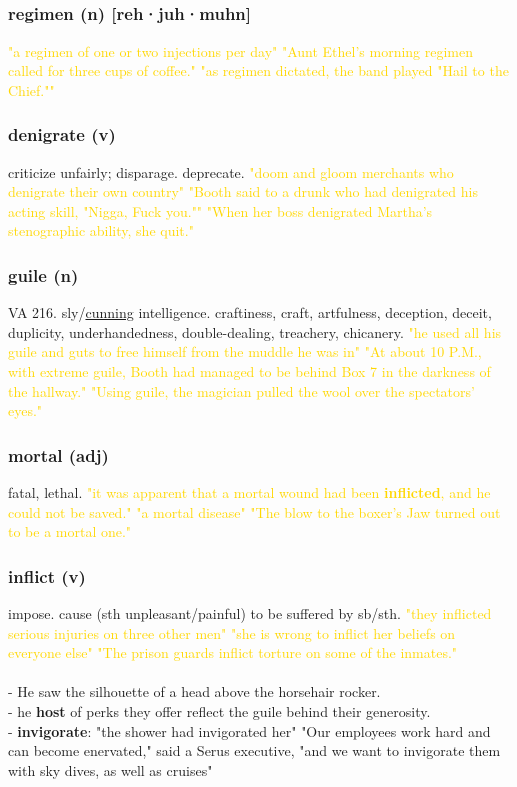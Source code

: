\documentclass{proc}
\begin{document}
	\newpage
	\subsection{}
	\subsubsection{\textcolor{brickred}{regimen} (n) [reh·juh·muhn]}
	\textcolor{gold}{"a regimen of one or two injections per day" "Aunt Ethel's morning regimen called for three cups of coffee." "as regimen dictated, the band played "Hail to the Chief.""}
	
	\subsubsection{\textcolor{brickred}{denigrate} (v)}
	criticize unfairly; disparage. deprecate.
	\textcolor{gold}{"doom and gloom merchants who denigrate their own country" "Booth said to a drunk who had denigrated his acting skill, "Nigga, Fuck you."" "When her boss denigrated Martha's stenographic ability, she quit."}
	
	\subsubsection{\textcolor{brickred}{guile} (n)}
	VA 216. sly/\underline{cunning} intelligence. craftiness, craft, artfulness, deception, deceit, duplicity, underhandedness, double-dealing, treachery, chicanery.
	\textcolor{gold}{"he used all his guile and guts to free himself from the muddle he was in" "At about 10 P.M., with extreme guile, Booth had managed to be behind Box 7 in the darkness of the hallway." "Using guile, the magician pulled the wool over the spectators' eyes."}
	
	\subsubsection{\textcolor{brickred}{mortal} (adj)}
	fatal, lethal.
	\textcolor{gold}{"it was apparent that a mortal wound had been \textbf{inflicted}, and he could not be saved." "a mortal disease" "The blow to the boxer's Jaw turned out to be a mortal one."}
	
	\subsubsection{\textcolor{brickred}{inflict} (v)}
	impose. cause (sth unpleasant/painful) to be suffered by sb/sth.
	\textcolor{gold}{"they inflicted serious injuries on three other men" "she is wrong to inflict her beliefs on everyone else" "The prison guards inflict torture on some of the inmates."}\\\\
	- He saw the silhouette of a head above the horsehair rocker.\\
	- he \textbf{host} of perks they offer reflect the guile behind their generosity.\\
	- \textbf{invigorate}: "the shower had invigorated her" "Our employees work hard and can become enervated," said a Serus executive, "and we want to invigorate them with sky dives, as well as cruises"
	
\end{document}
